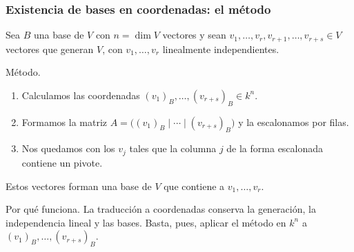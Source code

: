 \begin{frame}
    \frametitle{Existencia de bases en coordenadas: el método}

    Sea \(B\) una base de \(V\) con \(n=\dim V\) vectores y sean
    \(v_1,\ldots,v_r,v_{r+1},\ldots,v_{r+s}\in V\) vectores que generan
    \(V\), con \(v_1,\ldots,v_r\) linealmente independientes.

    \medskip

    \alert{Método.}
    \begin{enumerate}
        \item Calculamos las coordenadas \((v_1)_B,\ldots,(v_{r+s})_B\in k^n\).
        \item Formamos la matriz
              \(A=\bigl((v_1)_B\mid\cdots\mid(v_{r+s})_B\bigr)\) y la
              escalonamos por filas.
        \item Nos quedamos con los \(v_j\) tales que la columna \(j\) de
              la forma escalonada contiene un pivote.
    \end{enumerate}
    Estos vectores forman una base de \(V\) que contiene a
    \(v_1,\ldots,v_r\).

    \medskip

    \alert{Por qué funciona.} La traducción a coordenadas conserva la
    generación, la independencia lineal y las bases. Basta, pues, aplicar
    el método en \(k^n\) a \((v_1)_B,\ldots,(v_{r+s})_B\).
\end{frame}


